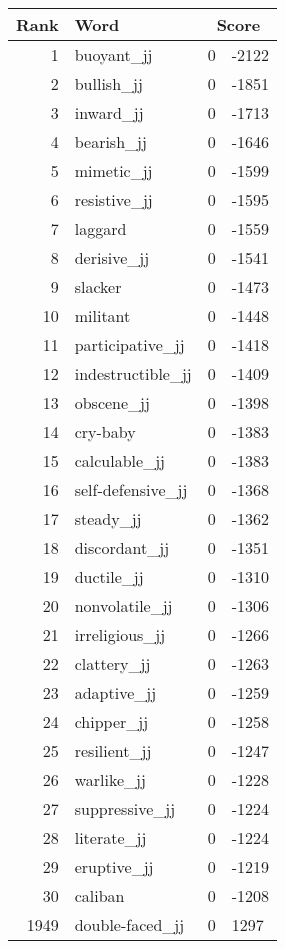 \begin{longtable}[!htbp]{| rlr@{.}l |}
    \hline
    \textbf{Rank} & \textbf{Word} & \multicolumn{2}{c|}{\textbf{Score}} \\
    \hline
    \endhead
    1 & buoyant\_jj & 0 & -2122 \\
    2 & bullish\_jj & 0 & -1851 \\
    3 & inward\_jj & 0 & -1713 \\
    4 & bearish\_jj & 0 & -1646 \\
    5 & mimetic\_jj & 0 & -1599 \\
    6 & resistive\_jj & 0 & -1595 \\
    7 & laggard & 0 & -1559 \\
    8 & derisive\_jj & 0 & -1541 \\
    9 & slacker & 0 & -1473 \\
    10 & militant & 0 & -1448 \\
    11 & participative\_jj & 0 & -1418 \\
    12 & indestructible\_jj & 0 & -1409 \\
    13 & obscene\_jj & 0 & -1398 \\
    14 & cry-baby & 0 & -1383 \\
    15 & calculable\_jj & 0 & -1383 \\
    16 & self-defensive\_jj & 0 & -1368 \\
    17 & steady\_jj & 0 & -1362 \\
    18 & discordant\_jj & 0 & -1351 \\
    19 & ductile\_jj & 0 & -1310 \\
    20 & nonvolatile\_jj & 0 & -1306 \\
    21 & irreligious\_jj & 0 & -1266 \\
    22 & clattery\_jj & 0 & -1263 \\
    23 & adaptive\_jj & 0 & -1259 \\
    24 & chipper\_jj & 0 & -1258 \\
    25 & resilient\_jj & 0 & -1247 \\
    26 & warlike\_jj & 0 & -1228 \\
    27 & suppressive\_jj & 0 & -1224 \\
    28 & literate\_jj & 0 & -1224 \\
    29 & eruptive\_jj & 0 & -1219 \\
    30 & caliban & 0 & -1208 \\
    1949 & double-faced\_jj & 0 & 1297 \\

\end{longtable}
